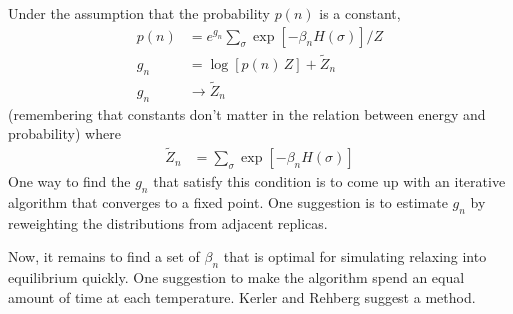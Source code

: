 \documentclass[11pt]{amsart}
\begin{document}
Under the assumption that the probability $p(n)$ is a constant,
\begin{align}
	p(n) &= e^{g_n} \sum_\sigma \exp\left[ -\beta_n H(\sigma) \right]/Z\\
	g_n &= \log[p(n)\,Z] + \tilde{Z}_n\\
	g_n &\rightarrow \tilde{Z}_n
\end{align}
(remembering that constants don't matter in the relation between energy and probability) where 
\begin{align}
	\tilde{Z}_n &= \sum_\sigma \exp\left[ -\beta_n H(\sigma) \right]
\end{align}
One way to find the $g_n$ that satisfy this condition is to come up with an iterative algorithm that converges to a fixed point. One suggestion is to estimate $g_n$ by reweighting the distributions from adjacent replicas.

Now, it remains to find a set of $\beta_n$ that is optimal for simulating relaxing into equilibrium quickly. One suggestion to make the algorithm spend an equal amount of time at each temperature. Kerler and Rehberg suggest a method.
\end{document}
